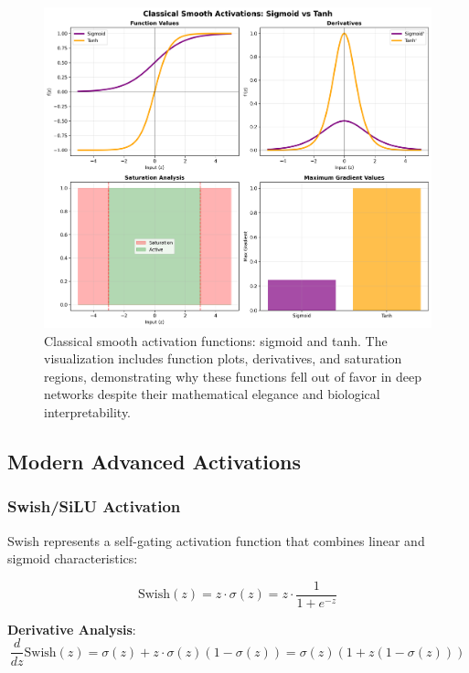 \documentclass[11pt,a4paper]{report}
\begin{document}
\begin{figure}[H]
\centering
\includegraphics[width=\textwidth]{activation_classical_smooth.png}
\caption{Classical smooth activation functions: sigmoid and tanh. The visualization includes function plots, derivatives, and saturation regions, demonstrating why these functions fell out of favor in deep networks despite their mathematical elegance and biological interpretability.}
\label{fig:activation_classical}
\end{figure}

\subsection{Modern Advanced Activations}

\subsubsection{Swish/SiLU Activation}

Swish represents a self-gating activation function that combines linear and sigmoid characteristics:

\begin{equation}
\text{Swish}(z) = z \cdot \sigma(z) = z \cdot \frac{1}{1 + e^{-z}}
\end{equation}

\textbf{Derivative Analysis}:
\begin{equation}
\frac{d}{dz}\text{Swish}(z) = \sigma(z) + z \cdot \sigma(z)(1 - \sigma(z)) = \sigma(z)(1 + z(1 - \sigma(z)))
\end{equation}
\end{document}
